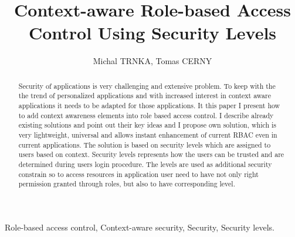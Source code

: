 \documentclass{poster15}
\begin{document}

%
\title{Context-aware Role-based Access Control Using Security Levels}
%

%
\author{Michal TRNKA, Tomas CERNY}
%


\maketitle


\begin{abstract}
Security of applications is very challenging and extensive problem. To keep with the the trend of personalized applications and with increased interest in context aware applications it needs to be adapted for those applications. It this paper I present how to add context awareness elements into role based access control. I describe already existing solutions and point out their key ideas and I propose own solution, which is very lightweight, universal and allows instant enhancement of current RBAC even in current applications. The solution is based on security levels which are assigned to users based on context. Security levels represents how the users can be trusted and are determined during users login procedure. The levels are used as additional security constrain so to access resources in application user need to have not only right permission granted through roles, but also to have corresponding level.
\end{abstract}


\begin{keywords}
Role-based access control, Context-aware security, Security, Security levels.
\end{keywords}
\end{document}
